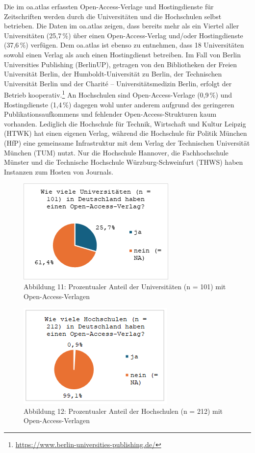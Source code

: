 \documentclass[a4paper,
fontsize=11pt,
oneside,
numbers=noperiodatend,
parskip=half-,
bibliography=totoc,
final
]{scrartcl}
\begin{document}
Die im oa.atlas erfassten Open-Access-Verlage und Hostingdienste für Zeitschriften werden durch die Universitäten und die Hochschulen selbst betrieben. Die Daten im oa.atlas zeigen, dass bereits
mehr als ein Viertel aller Universitäten (25,7\,\%) über einen
Open-Access-Verlag \mbox{und/}oder Hostingdienste (37,6\,\%) verfügen. Dem
oa.atlas ist ebenso zu entnehmen, dass 18 Universitäten sowohl einen
Verlag als auch einen Hostingdienst betreiben. Im Fall von Berlin
Universities Publishing (BerlinUP), getragen von den Bibliotheken der
Freien Universität Berlin, der Humboldt-Universität zu Berlin, der
Technischen Universität Berlin und der Charité -- Universitätsmedizin
Berlin, erfolgt der Betrieb kooperativ.\footnote{\url{https://www.berlin-universities-publishing.de/}}
An Hochschulen sind Open-Access-Verlage (0,9\,\%) und Hostingdienste
(1,4\,\%) dagegen wohl unter anderem aufgrund des geringeren
Publikationsaufkommens und fehlender Open-Access-Strukturen kaum
vorhanden. Lediglich die Hochschule für Technik, Wirtschaft und Kultur
Leipzig (HTWK) hat einen eigenen Verlag, während die Hochschule für
Politik München (HfP) eine gemeinsame Infrastruktur mit dem Verlag der
Technischen Universität München (TUM) nutzt. Nur die Hochschule
Hannover, die Fachhochschule Münster und die Technische Hochschule
Würzburg-Schweinfurt (THWS) haben Instanzen zum Hosten von Journals.


\begin{figure}[H]
\centering
\includegraphics[]{img/image012.png}
\caption{Abbildung 11: Prozentualer Anteil der Universitäten (n = 101) mit Open-Access-Verlagen}
\end{figure}

\begin{figure}[H]
\centering
\includegraphics[]{img/image011.png}
\caption{Abbildung 12: Prozentualer Anteil der Hochschulen (n = 212) mit Open-Access-Verlagen}
\end{figure}
\end{document}
